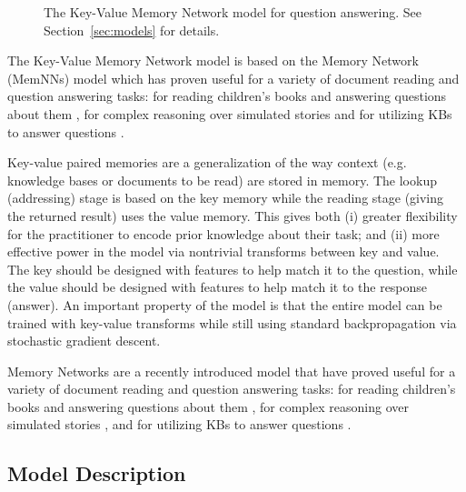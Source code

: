 
\begin{figure*}[t!]
\centerline {
	\epsfxsize=6.5in
  }
  \caption{\label{fig:KV-Memnn_diagram} The Key-Value Memory Network model for question answering. See Section~\ref{sec:models} for details.}
\end{figure*}


The Key-Value Memory Network model is based on the  Memory Network (MemNNs)
model \citep{Weston14,sukhbaatar2015end} which has proven useful for a variety of
document reading and question answering tasks:
for reading children's books and answering questions about them \citep{hill2015goldilocks},
for complex reasoning over simulated stories \citep{weston2015towards}
and for utilizing KBs to answer questions \citep{bordes2015large}.

Key-value paired memories are a generalization of the way context (e.g. knowledge bases or
documents to be read) are stored in memory. The lookup (addressing) stage is based on the key
memory while the reading stage (giving the returned result) uses the value memory.
This gives both (i) greater flexibility for the practitioner to encode prior knowledge
about their task; and (ii) more effective power in the model via nontrivial
transforms between key and value.
The key should be designed with features to help match it to the question,
while the value should be designed with features to help match it to the response (answer).
An important property of the model is that the entire model
can be trained with key-value transforms
while still using standard backpropagation via stochastic gradient descent.



Memory Networks \citep{Weston14,sukhbaatar2015end}
 are a recently introduced model that have proved useful for a variety of
document reading and question answering tasks:
for reading children's books and answering questions about them \citep{hill2015goldilocks},
for complex reasoning over simulated stories \citep{weston2015towards},
and for utilizing KBs to answer questions \citep{bordes2015large}.
\fi

\subsection{Model Description}

